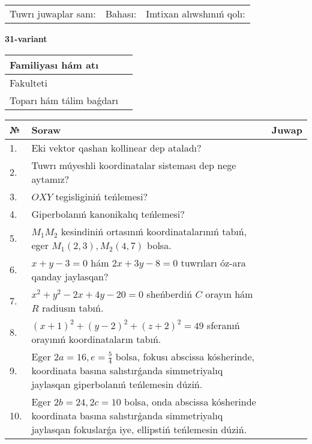 \documentclass{article}
\begin{document}
\vspace{1cm}

\begin{tabular}{lll}
Tuwrı juwaplar sanı: \underline{\hspace{1.5cm}} & 
Bahası: \underline{\hspace{1.5cm}} & 
Imtixan alıwshınıń qolı: \underline{\hspace{2cm}} \\
\end{tabular}

\egroup

\newpage


\textbf{31-variant}\\

\bgroup
\def\arraystretch{1.6} %

\begin{tabular}{|m{5.7cm}|m{9.5cm}|}
\hline
Familiyası hám atı & \\
\hline
Fakulteti  & \\
\hline
Toparı hám tálim baǵdarı  & \\
\hline
\end{tabular}

\vspace{1cm}

\begin{tabular}{|m{0.7cm}|m{10cm}|m{4cm}|}
\hline
№ & Soraw & Juwap \\
\hline
1. & Eki vektor qashan kollinear dep ataladı? &  \\
\hline
2. & Tuwrı múyeshli koordinatalar sisteması dep nege aytamız? &  \\
\hline
3. & $OXY$ tegisliginiń teńlemesi? &  \\
\hline
4. & Giperbolanıń kanonikalıq teńlemesi? &  \\
\hline
5. & $M_{1}M_{2}$ kesindiniń ortasınıń koordinatalarınıń tabıń, eger $M_{1} (2, 3), M_{2} (4, 7)$ bolsa. &  \\
\hline
6. & $x+y-3=0$ hám $2x+3y-8=0$ tuwrıları óz-ara qanday jaylasqan? &  \\
\hline
7. & $x^{2}+y^{2}-2x+4y-20=0$ sheńberdiń $C$ orayın hám $R$ radiusın tabıń. &  \\
\hline
8. & $(x+1)^{2}+(y-2) ^{2}+(z+2) ^{2}=49$ sferanıń orayınıń koordinataların tabıń. &  \\
\hline
9. & Eger $2a=16, e=\frac{5}{4}$ bolsa, fokusı abscissa kósherinde, koordinata basına salıstırǵanda simmetriyalıq jaylasqan giperbolanıń teńlemesin dúziń. &  \\
\hline
10. & Eger $2b=24, 2 c=10$ bolsa, onda abscissa kósherinde koordinata basına salıstırǵanda simmetriyalıq jaylasqan fokuslarǵa iye, ellipstiń teńlemesin dúziń. &  \\
\hline
\end{tabular}
\end{document}

